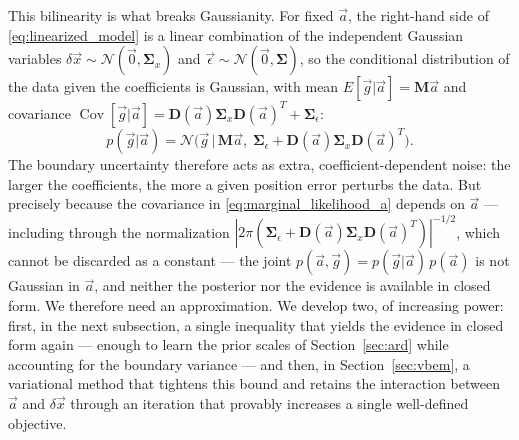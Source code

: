 \documentclass{article}
\begin{document}
This bilinearity is what breaks Gaussianity. For fixed $\vec a$, the right-hand side of \eqref{eq:linearized_model} is a linear combination of the independent Gaussian variables $\delta\vec x \sim \mathcal N(\vec 0, \mathbf{\Sigma}_x)$ and $\vec\epsilon \sim \mathcal N(\vec 0, \mathbf{\Sigma})$, so the conditional distribution of the data given the coefficients is Gaussian, with mean $E[\vec g|\vec a] = \mathbf M \vec a$ and covariance $\operatorname{Cov}[\vec g|\vec a] = \mathbf{D}(\vec{a})\mathbf{\Sigma}_x \mathbf{D}(\vec{a})^T + \mathbf{\Sigma}_\epsilon$:
\begin{equation}
    p(\vec{g}|\vec{a}) = \mathcal N\big(\vec g \,\big|\, \mathbf{M}\vec a,\; \mathbf{\Sigma}_\epsilon + \mathbf{D}(\vec{a})\mathbf{\Sigma}_x \mathbf{D}(\vec{a})^T\big). \label{eq:marginal_likelihood_a}
\end{equation}
The boundary uncertainty therefore acts as extra, coefficient-dependent noise: the larger the coefficients, the more a given position error perturbs the data. But precisely because the covariance in \eqref{eq:marginal_likelihood_a} depends on $\vec{a}$ --- including through the normalization $|2\pi(\mathbf{\Sigma}_\epsilon + \mathbf{D}(\vec{a})\mathbf{\Sigma}_x\mathbf{D}(\vec{a})^T)|^{-1/2}$, which cannot be discarded as a constant --- the joint $p(\vec a, \vec g) = p(\vec g|\vec a)\,p(\vec a)$ is not Gaussian in $\vec{a}$, and neither the posterior nor the evidence is available in closed form. We therefore need an approximation. We develop two, of increasing power: first, in the next subsection, a single inequality that yields the evidence in closed form again --- enough to learn the prior scales of Section~\ref{sec:ard} while accounting for the boundary variance --- and then, in Section~\ref{sec:vbem}, a variational method that tightens this bound and retains the interaction between $\vec a$ and $\delta\vec x$ through an iteration that provably increases a single well-defined objective.
\end{document}
